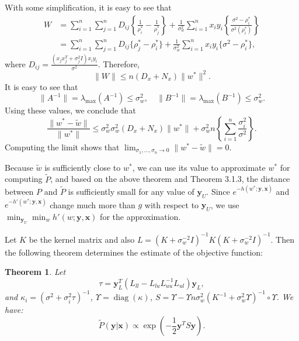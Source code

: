 \documentclass[12pt]{article}
\newtheorem{theorem}{Theorem}[section]
\DeclareMathOperator{\diag}{diag}
\begin{document}
	With some simplification, it is easy to see that
	\begin{align}
		W &= \sum_{i=1}^{n} \sum_{j=1}^{n} D_{ij} \left\{ \frac{1}{\rho_i^*} - \frac{1}{\rho_j^*} \right\} + \frac{1}{\sigma_w^2} \sum_{i=1}^{n} x_i y_i \left\{ \frac{\sigma^2 - \rho_i^*}{\sigma^2 (\rho_i^*)} \right\} \\
		&= \sum_{i=1}^{n} \sum_{j=1}^{n} D_{ij} \{ \rho_j^* - \rho_i^* \} + \frac{1}{\sigma_w^2} \sum_{i=1}^{n} x_i y_i \{ \sigma^2 - \rho_i^* \},
	\end{align}
	where $D_{ij} = \frac{(x_j x_j^T + \sigma_j^2 I) x_i y_i}{\sigma^2}$. Therefore,
	\begin{equation}
		\|W\| \le n \left( D_x + N_x \right) \|w^*\|^2.
	\end{equation}
	It is easy to see that
	\begin{equation}
		\|A^{-1}\| = \lambda_{\max}(A^{-1}) \le \sigma_w^2, \quad \|B^{-1}\| = \lambda_{\max}(B^{-1}) \le \sigma_w^2.
	\end{equation}
	Using these values, we conclude that
	\begin{equation}
		\frac{\|w^* - \tilde{w}\|}{\|w^*\|} \le \sigma_w^2 \sigma_w^2 (D_x + N_x) \|w^*\| + \sigma_w^2 n \left\{ \sum_{i=1}^{n} \frac{\sigma_i^2}{\sigma^2} \right\}.
	\end{equation}
	Computing the limit shows that $\lim_{\sigma_1, \ldots, \sigma_n \to 0} \|w^* - \tilde{w}\| = 0$.
	
	Because $\tilde{w}$ is sufficiently close to $w^*$, we can use its value to approximate $w^*$ for computing $\tilde{P}$, and based on the above theorem and Theorem 3.1.3, the distance between $P$ and $\tilde{P}$ is sufficiently small for any value of $\mathbf{y}_U$. Since $e^{-h(w^*; \mathbf{y}, \mathbf{x})}$ and $e^{-h'(w^*; \mathbf{y}, \mathbf{x})}$ change much more than $g$ with respect to $\mathbf{y}_U$, we use $\min_{\mathbf{y}_U} \min_w h'(w; \mathbf{y}, \mathbf{x})$ for the approximation.
	
	Let $K$ be the kernel matrix and also $L = (K + \sigma_w^{-2} I)^{-1} K (K + \sigma_w^{-2} I)^{-1}$. Then the following theorem determines the estimate of the objective function:
	
	\begin{theorem}
		Let
		\begin{equation}
			\tau = \mathbf{y}_L^T (L_{ll} - L_{lu} L_{uu}^{-1} L_{ul}) \mathbf{y}_L,
		\end{equation}
		and $\kappa_i = (\sigma^2 + \sigma_i^2 \tau)^{-1}$, $\Upsilon = \diag(\kappa)$, $S = \Upsilon - \Upsilon n \sigma_w^2 (K^{-1} + \sigma_w^2 \Upsilon)^{-1} \circ \Upsilon$.
		We have:
		\begin{equation}
			\tilde{P}(\mathbf{y}|\mathbf{x}) \propto \exp\left( -\frac{1}{2} \mathbf{y}^T S \mathbf{y} \right).
		\end{equation}
	\end{theorem}
	
\end{document}
